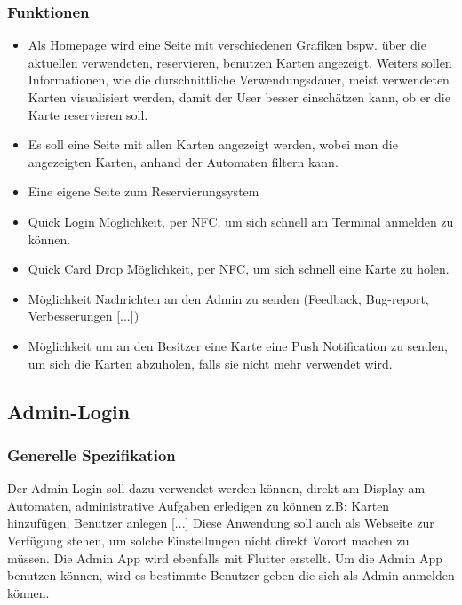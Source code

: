 \documentclass[a4paper]{article}
\begin{document}
\subsubsection{Funktionen}
\begin{itemize}
  \item Als Homepage wird eine Seite mit verschiedenen Grafiken bspw. über die aktuellen verwendeten, reservieren, benutzen Karten angezeigt. Weiters sollen Informationen, wie die durschnittliche Verwendungsdauer, meist verwendeten Karten visualisiert werden, damit der User besser einschätzen kann, ob er die Karte reservieren soll.
  \item Es soll eine Seite mit allen Karten angezeigt werden, wobei man die angezeigten Karten, anhand der Automaten filtern kann.
  \item Eine eigene Seite zum Reservierungsystem
  \item Quick Login Möglichkeit, per NFC, um sich schnell am Terminal anmelden zu können. 
  \item Quick Card Drop Möglichkeit, per NFC, um sich schnell eine Karte zu holen.
  \item Möglichkeit Nachrichten an den Admin zu senden (Feedback, Bug-report, Verbesserungen [...])
  \item Möglichkeit um an den Besitzer eine Karte eine Push Notification zu senden, um sich die Karten abzuholen, falls sie nicht mehr verwendet wird.
\end{itemize}

\subsection{Admin-Login}
\subsubsection{Generelle Spezifikation}
Der Admin Login soll dazu verwendet werden können, direkt am Display am Automaten, administrative Aufgaben erledigen zu können z.B: Karten hinzufügen, Benutzer anlegen [...] Diese Anwendung soll auch als Webseite zur Verfügung stehen, um solche Einstellungen nicht direkt Vorort machen zu müssen. Die Admin App wird ebenfalls mit Flutter erstellt. Um die Admin App benutzen können, wird es bestimmte Benutzer geben die sich als Admin anmelden können. 
\end{document}
